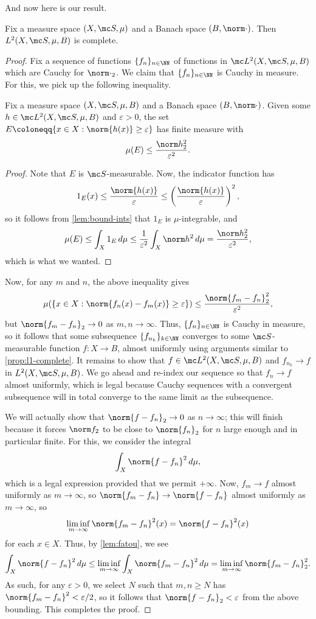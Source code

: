 \documentclass[../notes.tex]{subfiles}
\begin{document}
And now here is our result.
\begin{theorem}
	Fix a measure space $(X,\mc S,\mu)$ and a Banach space $(B,\norm\cdot)$. Then $L^2(X,\mc S,\mu,B)$ is complete.
\end{theorem}
\begin{proof}
	Fix a sequence of functions $\{f_n\}_{n\in\NN}$ of functions in $\mc L^2(X,\mc S,\mu,B)$ which are Cauchy for $\norm\cdot_2$. We claim that $\{f_n\}_{n\in\NN}$ is Cauchy in measure. For this, we pick up the following inequality.
	\begin{lemma}[Chebychev]
		Fix a measure space $(X,\mc S,\mu,B)$ and a Banach space $(B,\norm\cdot)$. Given some $h\in\mc L^2(X,\mc S,\mu,B)$ and $\varepsilon>0$, the set $E\coloneqq\{x\in X:\norm{h(x)}\ge\varepsilon\}$ has finite measure with
		\[\mu(E)\le\frac{\norm h_2^2}{\varepsilon^2}.\]
	\end{lemma}
	\begin{proof}
		Note that $E$ is $\mc S$-measurable. Now, the indicator function has
		\[1_{E}(x)\le\frac{\norm{h(x)}}\varepsilon\le\left(\frac{\norm{h(x)}}\varepsilon\right)^2,\]
		so it follows from \autoref{lem:bound-ints} that $1_E$ is $\mu$-integrable, and
		\[\mu(E)\le\int_X1_E\,d\mu\le\frac1{\varepsilon^2}\int_X\norm h^2\,d\mu=\frac{\norm h_2^2}{\varepsilon^2},\]
		which is what we wanted.
	\end{proof}
	Now, for any $m$ and $n$, the above inequality gives
	\[\mu(\{x\in X:\norm{f_n(x)-f_m(x)}\ge\varepsilon\})\le\frac{\norm{f_m-f_n}_2^2}{\varepsilon^2},\]
	but $\norm{f_m-f_n}_2\to0$ as $m,n\to\infty$. Thus, $\{f_n\}_{n\in\NN}$ is Cauchy in measure, so it follows that some subsequence $\{f_{n_k}\}_{k\in\NN}$ converges to some $\mc S$-measurable function $f\colon X\to B$, almost uniformly using arguments similar to \autoref{prop:l1-complete}. It remains to show that $f\in\mc L^2(X,\mc S,\mu,B)$ and $f_{n_k}\to f$ in $L^2(X,\mc S,\mu,B)$. We go ahead and re-index our sequence so that $f_n\to f$ almost uniformly, which is legal because Cauchy sequences with a convergent subsequence will in total converge to the same limit as the subsequence.

	We will actually show that $\norm{f-f_n}_2\to0$ as $n\to\infty$; this will finish because it forces $\norm f_2$ to be close to $\norm{f_n}_2$ for $n$ large enough and in particular finite. For this, we consider the integral
	\[\int_X\norm{f-f_n}^2\,d\mu,\]
	which is a legal expression provided that we permit $+\infty$. Now, $f_m\to f$ almost uniformly as $m\to\infty$, so $\norm{f_m-f_n}\to\norm{f-f_n}$ almost uniformly as $m\to\infty$, so
	\[\liminf_{m\to\infty}\norm{f_m-f_n}^2(x)=\norm{f-f_n}^2(x)\]
	for each $x\in X$. Thus, by \autoref{lem:fatou}, we see
	\[\int_X\norm{f-f_n}^2\,d\mu\le\liminf_{m\to\infty}\int_X\norm{f_m-f_n}^2\,d\mu=\liminf_{m\to\infty}\norm{f_m-f_n}_2^2.\]
	As such, for any $\varepsilon>0$, we select $N$ such that $m,n\ge N$ has $\norm{f_m-f_n}^2<\varepsilon/2$, so it follows that $\norm{f-f_n}_2<\varepsilon$ from the above bounding. This completes the proof.
\end{proof}
\end{document}
